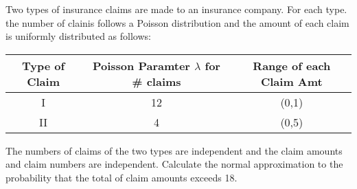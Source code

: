Two types of insurance claims are made to an insurance company. For each type. the number of clainis follows a Poisson distribution and the amount of each claim is uniformly distributed as follows: 
\begin{center}\begin{tabular}{|c|c|c|}\hline
Type of Claim & Poisson Paramter $\lambda$ for \# claims & Range of each Claim Amt \\ \hline
I & 12 & (0,1) \\ 
II & 4 & (0,5) \\ \hline
\end{tabular}\end{center}


The numbers of claims of the two types are independent and the claim amounts and claim numbers are independent. 
Calculate the normal approximation to the probability that the total of claim amounts exceeds 18. 


